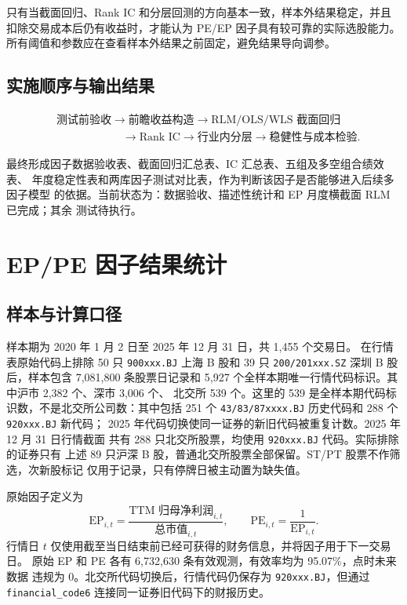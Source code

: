 \documentclass[UTF8,a4paper,11pt]{ctexart}
\begin{document}
只有当截面回归、Rank IC 和分层回测的方向基本一致，样本外结果稳定，并且
扣除交易成本后仍有收益时，才能认为 PE/EP 因子具有较可靠的实际选股能力。
所有阈值和参数应在查看样本外结果之前固定，避免结果导向调参。

\subsection{实施顺序与输出结果}

\begin{equation*}
\begin{aligned}
  &\text{测试前验收}
  \longrightarrow \text{前瞻收益构造}
  \longrightarrow \text{RLM/OLS/WLS 截面回归} \\
  &\hspace{6em}\longrightarrow \text{Rank IC}
  \longrightarrow \text{行业内分层}
  \longrightarrow \text{稳健性与成本检验}.
\end{aligned}
\end{equation*}

最终形成因子数据验收表、截面回归汇总表、IC 汇总表、五组及多空组合绩效表、
年度稳定性表和两库因子测试对比表，作为判断该因子是否能够进入后续多因子模型
的依据。当前状态为：数据验收、描述性统计和 EP 月度横截面 RLM 已完成；其余
测试待执行。

\clearpage
\section{EP/PE 因子结果统计}

\subsection{样本与计算口径}

样本期为 2020 年 1 月 2 日至 2025 年 12 月 31 日，共 1,455 个交易日。
在行情表原始代码上排除 50 只 \texttt{900xxx.BJ} 上海 B 股和 39 只
\texttt{200/201xxx.SZ} 深圳 B 股后，样本包含 7,081,800 条股票日记录和
5,927 个全样本期唯一行情代码标识。其中沪市 2,382 个、深市 3,006 个、
北交所 539 个。这里的 539 是全样本期代码标识数，不是北交所公司数：其中包括
251 个 \texttt{43/83/87xxxx.BJ} 历史代码和 288 个 \texttt{920xxx.BJ} 新代码；
2025 年代码切换使同一证券的新旧代码被重复计数。2025 年 12 月 31 日行情截面
共有 288 只北交所股票，均使用 \texttt{920xxx.BJ} 代码。实际排除的证券只有
上述 89 只沪深 B 股，普通北交所股票全部保留。ST/PT 股票不作筛选，次新股标记
仅用于记录，只有停牌日被主动置为缺失值。

原始因子定义为
\begin{equation}
  \mathrm{EP}_{i,t}
  =\frac{\text{TTM 归母净利润}_{i,t}}{\text{总市值}_{i,t}},
  \qquad
  \mathrm{PE}_{i,t}=\frac{1}{\mathrm{EP}_{i,t}}.
\end{equation}
行情日 $t$ 仅使用截至当日结束前已经可获得的财务信息，并将因子用于下一交易日。
原始 EP 和 PE 各有 6,732,630 条有效观测，有效率均为 95.07\%，点时未来数据
违规为 0。北交所代码切换后，行情代码仍保存为 \texttt{920xxx.BJ}，但通过
\texttt{financial\_code6} 连接同一证券旧代码下的财报历史。
\end{document}
